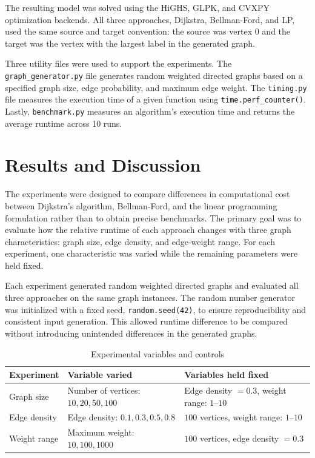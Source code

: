 \documentclass[12pt]{report}
\begin{document}
The resulting model was solved using the HiGHS, GLPK, and CVXPY optimization backends. All three approaches, Dijkstra, Bellman-Ford, and LP, used the same source and target convention: the source was vertex $0$ and the target was the vertex with the largest label in the generated graph. 

Three utility files were used to support the experiments. The \texttt{graph\_generator.py} file generates random weighted directed graphs based on a specified graph size, edge probability, and maximum edge weight. The \texttt{timing.py} file measures the execution time of a given function using \texttt{time.perf\_counter()}. Lastly, \texttt{benchmark.py} measures an algorithm's execution time and returns the average runtime across 10 runs. 



\chapter{Results and Discussion}

The experiments were designed to compare differences in computational cost between Dijkstra's algorithm, Bellman-Ford, and the linear programming formulation rather than to obtain precise benchmarks. The primary goal was to evaluate how the relative runtime of each approach changes with three graph characteristics: graph size, edge density, and edge-weight range. For each experiment, one characteristic was varied while the remaining parameters were held fixed.

Each experiment generated random weighted directed graphs and evaluated all three approaches on the same graph instances. The random number generator was initialized with a fixed seed, \texttt{random.seed(42)}, to ensure reproducibility and consistent input generation. This allowed runtime difference to be compared without introducing unintended differences in the generated graphs.

\begin{table}[H]
\centering
\caption{Experimental variables and controls}
\label{tab:experimental_variables}
\begin{tabular}{lll}
\hline
\textbf{Experiment} & \textbf{Variable varied} & \textbf{Variables held fixed} \\
\hline
Graph size &
Number of vertices: $10,20,50,100$ &
Edge density $=0.3$, weight range: $1$--$10$ \\

Edge density &
Edge density: $0.1,0.3,0.5,0.8$ &
$100$ vertices, weight range: $1$--$10$ \\

Weight range &
Maximum weight: $10,100,1000$ &
$100$ vertices, edge density $=0.3$ \\
\hline
\end{tabular}
\end{table}
\end{document}
